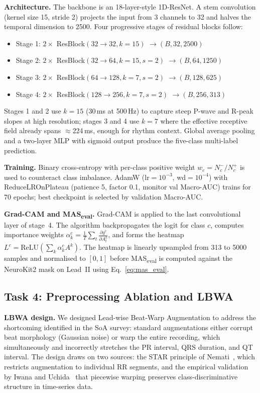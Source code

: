 \documentclass{article}
\begin{document}
\textbf{Architecture.}
The backbone is an 18-layer-style 1D-ResNet. A stem convolution
(kernel size 15, stride 2) projects the input from 3 channels to 32
and halves the temporal dimension to 2500. Four progressive stages
of residual blocks follow:
\begin{itemize}
  \item Stage 1: $2 \times$ ResBlock$(32\to32, k=15)$ $\to (B, 32, 2500)$
  \item Stage 2: $2 \times$ ResBlock$(32\to64, k=15, s=2)$ $\to (B, 64, 1250)$
  \item Stage 3: $2 \times$ ResBlock$(64\to128, k=7, s=2)$ $\to (B, 128, 625)$
  \item Stage 4: $2 \times$ ResBlock$(128\to256, k=7, s=2)$ $\to (B, 256, 313)$
\end{itemize}
Stages 1 and 2 use $k{=}15$ (30\,ms at 500\,Hz) to capture steep P-wave
and R-peak slopes at high resolution; stages 3 and 4 use $k{=}7$
where the effective receptive field already spans $\approx$224\,ms,
enough for rhythm context. Global average pooling and a two-layer MLP
with sigmoid output produce the five-class multi-label prediction.

\textbf{Training.}
Binary cross-entropy with per-class positive weight
$w_c = N^{-}_c / N^{+}_c$ is used to counteract class imbalance.
AdamW (lr$=10^{-3}$, wd$=10^{-4}$) with ReduceLROnPlateau
(patience 5, factor 0.1, monitor val Macro-AUC) trains for 70 epochs;
best checkpoint is selected by validation Macro-AUC.

\textbf{Grad-CAM and MAS\textsubscript{eval}.}
Grad-CAM is applied to the last convolutional layer of stage~4. The
algorithm backpropagates the logit for class $c$, computes importance
weights $\alpha^c_k = \frac{1}{T}\sum_t \frac{\partial y^c}{\partial A^k_t}$,
and forms the heatmap $L^c = \mathrm{ReLU}(\sum_k \alpha^c_k A^k)$.
The heatmap is linearly upsampled from 313 to 5000 samples and
normalised to $[0,1]$ before MAS\textsubscript{eval} is computed
against the NeuroKit2 mask on Lead~II using Eq.~\ref{eq:mas_eval}.

\subsection{Task 4: Preprocessing Ablation and LBWA}
\label{sec:task4}

\textbf{LBWA design.}
We designed Lead-wise Beat-Warp Augmentation to address the
shortcoming identified in the SoA survey: standard augmentations
either corrupt beat morphology (Gaussian noise) or warp the entire
recording, which simultaneously and incorrectly stretches the PR
interval, QRS duration, and QT interval. The design draws on two
sources: the STAR principle of Nemati~\cite{nemati2025}, which
restricts augmentation to individual RR segments, and the empirical
validation by Iwana and Uchida~\cite{iwana2021} that piecewise
warping preserves class-discriminative structure in time-series data.
\end{document}
